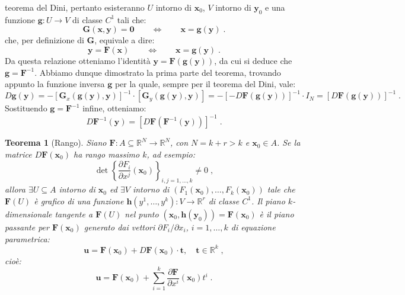 \documentclass[a4paper,12pt]{report}
\theoremstyle{plain}
\newtheorem{thm}{Teorema}[section]
\theoremstyle{definition}
\theoremstyle{remark}
\numberwithin{equation}{section}
\begin{document}
teorema del Dini, pertanto esisteranno $U$ intorno di $\mathbf{x}_0$, $V$ intorno di $\mathbf{y}_0$ e una funzione $\mathbf{g}:U\to V$ di classe $C^1$ tali che:
\begin{equation}
\mathbf{G}(\mathbf{x},\mathbf{y})=\mathbf{0}\qquad \Longleftrightarrow \qquad \mathbf{x}=\mathbf{g}(\mathbf{y})\;.
\end{equation}
che, per definizione di $\mathbf{G}$, equivale a dire:
\begin{equation}
\mathbf{y}=\mathbf{F}(\mathbf{x})\qquad \Longleftrightarrow\qquad \mathbf{x}=\mathbf{g}(\mathbf{y})\;.
\end{equation}
Da questa relazione otteniamo l'identità $\mathbf{y}=\mathbf{F}(\mathbf{g}(\mathbf{y}))$, da cui si deduce che $\mathbf{g}=\mathbf{F}^{-1}$. Abbiamo dunque dimostrato la prima parte del teorema, trovando appunto la funzione inversa $\mathbf{g}$ per la quale, sempre per il teorema del Dini, vale:
\begin{equation}
D\mathbf{g}(\mathbf{y})=-[\mathbf{G}_x(\mathbf{g}(\mathbf{y}),\mathbf{y})]^{-1}\cdot [\mathbf{G}_y(\mathbf{g}(\mathbf{y}),\mathbf{y})]=-[-D\mathbf{F}(\mathbf{g}(\mathbf{y}))]^{-1}\cdot I_N=[D\mathbf{F}(\mathbf{g}(\mathbf{y}))]^{-1}\;.
\end{equation}
Sostituendo $\mathbf{g}=\mathbf{F}^{-1}$ infine, otteniamo:
\begin{equation}
D\mathbf{F}^{-1}(\mathbf{y})=[D\mathbf{F}(\mathbf{F}^{-1}(\mathbf{y}))]^{-1}\;.
\end{equation}
\endproof
\begin{thm}[Rango] Siano $\mathbf{F}:A\subseteq\mathbb{R}^N\to\mathbb{R}^N$, con $N=k+r>k$ e $\mathbf{x}_0\in A$. Se la matrice $D\mathbf{F}(\mathbf{x}_0)$ ha rango massimo $k$, ad esempio:
\begin{equation}
\det \left\{\frac{\partial F_i}{\partial x^j}(\mathbf{x}_0)\right\}_{i,j=1,\ldots,k}\ne 0\;,
\end{equation}
allora $\exists U\subseteq A$ intorno di $\mathbf{x}_0$ ed $\exists V$ intorno di $(F_1(\mathbf{x}_0),\ldots,F_k(\mathbf{x}_0))$ tale che
 $\mathbf{F}(U)$ è grafico di una funzione $\mathbf{h}(y^1,\ldots,y^k):V\to\mathbb{R}^r$ di classe $C^1$. Il piano $k$-dimensionale 
tangente a $\mathbf{F}(U)$ nel punto $(\mathbf{x}_0,\mathbf{h}(\mathbf{y}_0))=\mathbf{F}(\mathbf{x}_0)$ è il piano passante per 
$\mathbf{F}(\mathbf{x}_0)$ generato dai vettori $\partial F_i/\partial x_i$, $i=1,\ldots,k$ di equazione parametrica:
\begin{equation}
\mathbf{u}=\mathbf{F}(\mathbf{x}_0)+D\mathbf{F}(\mathbf{x}_0)\cdot \mathbf{t},\quad \mathbf{t}\in\mathbb{R}^k\;,
\end{equation}
cioè:
\begin{equation}
\mathbf{u}=\mathbf{F}(\mathbf{x}_0)+\sum_{i=1}^k\frac{\partial \mathbf{F}}{\partial x^i}(\mathbf{x}_0)t^i\;.
\end{equation}
\end{thm}
\end{document}
